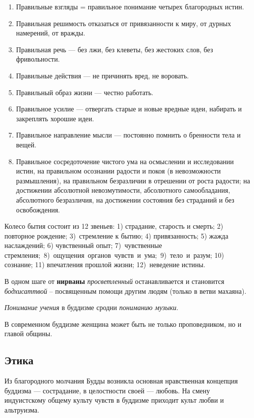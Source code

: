 \documentclass[a4paper]{article}
\newcommand\liststyleWWviiiNumvii{%
\renewcommand\theenumi{\arabic{enumi}}
\renewcommand\theenumii{\alph{enumii}}
\renewcommand\theenumiii{\roman{enumiii}}
\renewcommand\theenumiv{\arabic{enumiv}}
\renewcommand\labelenumi{\theenumi.}
\renewcommand\labelenumii{\theenumii.}
\renewcommand\labelenumiii{\theenumiii.}
\renewcommand\labelenumiv{\theenumiv.}
}
\begin{document}
\liststyleWWviiiNumvii
\begin{enumerate}
\item {
Правильные взгляды = правильное понимание четырех благородных истин.}
\item {
Правильная решимость отказаться от привязанности к миру, от дурных намерений, от вражды.}
\item {
Правильная речь — без лжи, без клеветы, без жестоких слов, без фривольности.}
\item {
Правильные действия — не причинять вред, не воровать.}
\item {
Правильный образ жизни — честно работать.}
\item {
Правильное усилие — отвергать старые и новые вредные идеи, набирать и закреплять хорошие идеи.}
\item {
Правильное направление мысли — постоянно помнить о бренности тела и вещей.}
\item {
Правильное сосредоточение чистого ума на осмыслении и исследовании истин, на правильном осознании радости и покоя (в
невозможности размышления), на правильном безразличии в отрешении от роста радости; на достижении абсолютной
невозмутимости, абсолютного самообладания, абсолютного безразличия, на достижении состояния без страданий и без
освобождения.}
\end{enumerate}
{
Колесо бытия состоит из 12 звеньев: 1) страдание, старость и смерть; 2) повторное рождение; 3)~стремление к бытию; 4)
привязанность; 5) жажда наслаждений; 6) чувственный опыт; 7)~чувственные
стремления;~8)~ощущения~органов~чувств~и~ума;~9)~тело~и~разум; 10) сознание; 11) впечатления прошлой жизни;
12)~неведение истины.}

{
В одном шаге от \textbf{нирваны} \textit{просветленный} останавливается и становится \textit{бодхисаттвой} – посвященным
помощи другим людям (только в ветви махаяна). }

{
\textit{Понимание учения} в буддизме сродни \textit{пониманию музыки}.}

{
В современном буддизме женщина может быть не только проповедником, но и главой общины.}

\subsection[Этика]{ Этика}
{
Из благородного молчания Будды возникла основная нравственная концепция буддизма — сострадание, в целостности своей —
любовь. На смену индуистскому общему культу чувств в буддизме приходит культ любви и альтруизма.}
\end{document}
